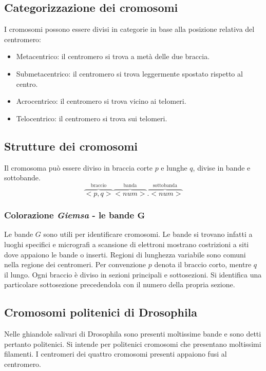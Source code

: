 	\subsection{Categorizzazione dei cromosomi}
	I cromosomi possono essere divisi in categorie in base alla posizione relativa del centromero:
	\begin{multicols}{2}
		\begin{itemize}
			\item Metacentrico: il centromero si trova a met\`a delle due braccia.
			\item Submetacentrico: il centromero si trova leggermente spostato rispetto al centro.
			\item Acrocentrico: il centromero si trova vicino ai telomeri.
			\item Telocentrico: il centromero si trova sui telomeri.
		\end{itemize}
	\end{multicols}

	\subsection{Strutture dei cromosomi}
	Il cromosoma pu\`o essere diviso in braccia corte $p$ e lunghe $q$, divise in bande e sottobande.
	\[\overbrace{<p,q>}^{\text{braccio}}\overbrace{<num>}^{\text{banda}}\overbrace{.<num>}^{\text{sottobanda}}\]

		\subsubsection{Colorazione \emph{Giemsa} - le bande $\mathbf{G}$}
		Le bande $G$ sono utili per identificare cromosomi.
		Le bande si trovano infatti a luoghi specifici e micrografi a scansione di elettroni mostrano costrizioni a siti dove appaiono le bande o inserti.
		Regioni di lunghezza variabile sono comuni nella regione dei centromeri.
		Per convenzione $p$ denota il braccio corto, mentre $q$ il lungo.
		Ogni braccio \`e diviso in sezioni principali e sottosezioni.
		Si identifica una particolare sottosezione precedendola con il numero della propria sezione.

	\subsection{Cromosomi politenici di Drosophila}
	Nelle ghiandole salivari di Drosophila sono presenti moltissime bande e sono detti pertanto politenici.
	Si intende per politenici cromosomi che presentano moltissimi filamenti.
	I centromeri dei quattro cromosomi presenti appaiono fusi al centromero.
		
